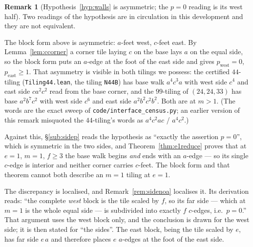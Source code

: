 \documentclass[11pt,reqno]{amsart}
\theoremstyle{plain}
\theoremstyle{definition}
\newtheorem{remark}[theorem]{Remark}
\begin{document}
\begin{remark}[Hypothesis~\ref{hyp:walls} is asymmetric; the $p=0$ reading is its west half]\label{rem:wallsfix}
Two readings of the hypothesis are in circulation in this development and they are not equivalent.

The block form above is asymmetric: $a$-feet west, $c$-feet east. By Lemma~\ref{lem:ccorner} a corner
tile laying $c$ on the base lays $a$ on the equal side, so the block form puts an $a$-edge at the foot
of the east side and gives $p_{\mathrm{west}}=0$, $p_{\mathrm{east}}\ge1$. That asymmetry is visible in
both tilings we possess: the certified $44$-tiling (\texttt{Tiling44.lean}, the tiling
\texttt{N44B}) has base walk $a^4c^3a$ with west side $c^4$ and east side $ca^2c^2$ read from the
base corner, and the $99$-tiling of $(24,24,33)$ has base $a^2b^7c^2$ with west side $c^6$ and
east side $a^2b^2c^2b^2$. Both are at $m>1$. (The words are the exact sweep of
\texttt{code/interface\_census.py}; an earlier version of this remark misquoted the $44$-tiling's
words as $a^4c^2ac$ / $a^4c^2$.)

Against this, \S\ref{sub:sidep} reads the hypothesis as ``exactly the assertion $p=0$'', which is
symmetric in the two sides, and Theorem~\ref{thm:e1reduce} proves that at $e=1$, $m=1$, $f\ge3$ the
base walk begins \emph{and} ends with an $a$-edge --- so its single $c$-edge is interior and neither
corner carries $c$-feet. The block form and that theorem cannot both describe an $m=1$ tiling at
$e=1$.

The discrepancy is localised, and Remark~\ref{rem:sidenoa} localises it. Its derivation reads: ``the
complete \emph{west} block is the tile scaled by $f$, so its far side --- which at $m=1$ is the whole
equal side --- is subdivided into exactly $f$ $c$-edges, i.e.\ $p=0$.'' That argument uses the west
block only, and the conclusion is drawn for the west side; it is then stated for ``the sides''. The
east block, being the tile scaled by $e$, has far side $e\,a$ and therefore places $e$ $a$-edges at the
foot of the east side.


\end{remark}
\end{document}
